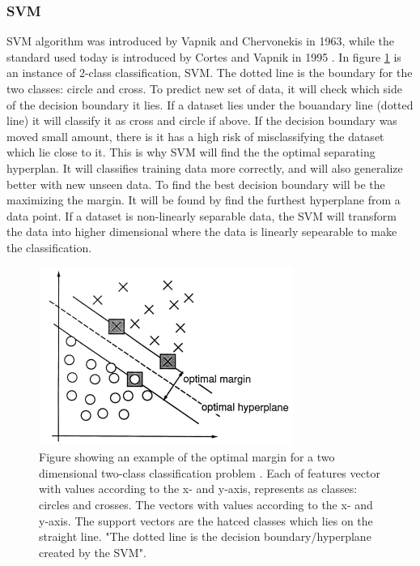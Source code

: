 \documentclass[USenglish]{ifimaster}  %
\begin{document}
\subsubsection{SVM}
SVM algorithm was introduced by Vapnik and Chervonekis in 1963, while the standard used today is introduced by Cortes and Vapnik in 1995 \cite{Cortes1995}. In figure \ref{fig:SVM} is an instance of 2-class classification, SVM. The dotted line is the boundary for the two classes: circle and cross. To predict new set of data, it will check which side of the decision boundary it lies. If a dataset lies under the bouandary line (dotted line) it will classify it as cross and circle if above. If the decision boundary was moved small amount, there is it has a high risk of misclassifying the dataset which lie close to it. This is why SVM will find the the optimal separating hyperplan. It will classifies training data more correctly, and will also generalize better with new unseen data. To find the best decision boundary will be the maximizing the margin. It will be found by find the furthest hyperplane from a data point. If a dataset is non-linearly separable data, the SVM will transform the data into higher dimensional where the data is linearly sepearable to make the classification.


\begin{figure}[h]
	\centering
	\includegraphics{Figures/SVM.PNG}
	\caption{Figure showing an example of the optimal margin for a two dimensional
		two-class classification problem \cite{Cortes1995}. Each of features vector with values according to the x- and y-axis, represents as classes: circles and crosses. The 
		vectors with values according to the x- and y-axis. The support vectors are the hatced classes which lies on the straight line. "The dotted line is the decision boundary/hyperplane created by the SVM".}
	\label{fig:SVM}
\end{figure}
\end{document}
